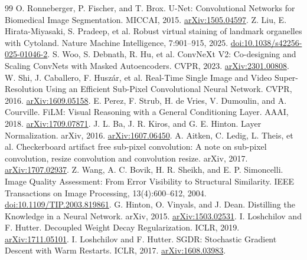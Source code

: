 \documentclass[UTF8,a4paper,zihao=5,fontset=fandol]{ctexart}
\begin{document}
\begin{thebibliography}{99}\small
\setlength{\itemsep}{1pt}
 O. Ronneberger, P. Fischer, and T. Brox. U-Net: Convolutional Networks for Biomedical Image Segmentation. MICCAI, 2015. \href{https://arxiv.org/abs/1505.04597}{arXiv:1505.04597}.
 Z. Liu, E. Hirata-Miyasaki, S. Pradeep, et al. Robust virtual staining of landmark organelles with Cytoland. Nature Machine Intelligence, 7:901--915, 2025. \href{https://doi.org/10.1038/s42256-025-01046-2}{doi:10.1038/s42256-025-01046-2}.
 S. Woo, S. Debnath, R. Hu, et al. ConvNeXt V2: Co-designing and Scaling ConvNets with Masked Autoencoders. CVPR, 2023. \href{https://arxiv.org/abs/2301.00808}{arXiv:2301.00808}.
 W. Shi, J. Caballero, F. Husz\'ar, et al. Real-Time Single Image and Video Super-Resolution Using an Efficient Sub-Pixel Convolutional Neural Network. CVPR, 2016. \href{https://arxiv.org/abs/1609.05158}{arXiv:1609.05158}.
 E. Perez, F. Strub, H. de Vries, V. Dumoulin, and A. Courville. FiLM: Visual Reasoning with a General Conditioning Layer. AAAI, 2018. \href{https://arxiv.org/abs/1709.07871}{arXiv:1709.07871}.
 J. L. Ba, J. R. Kiros, and G. E. Hinton. Layer Normalization. arXiv, 2016. \href{https://arxiv.org/abs/1607.06450}{arXiv:1607.06450}.
 A. Aitken, C. Ledig, L. Theis, et al. Checkerboard artifact free sub-pixel convolution: A note on sub-pixel convolution, resize convolution and convolution resize. arXiv, 2017. \href{https://arxiv.org/abs/1707.02937}{arXiv:1707.02937}.
 Z. Wang, A. C. Bovik, H. R. Sheikh, and E. P. Simoncelli. Image Quality Assessment: From Error Visibility to Structural Similarity. IEEE Transactions on Image Processing, 13(4):600--612, 2004. \href{https://doi.org/10.1109/TIP.2003.819861}{doi:10.1109/TIP.2003.819861}.
 G. Hinton, O. Vinyals, and J. Dean. Distilling the Knowledge in a Neural Network. arXiv, 2015. \href{https://arxiv.org/abs/1503.02531}{arXiv:1503.02531}.
 I. Loshchilov and F. Hutter. Decoupled Weight Decay Regularization. ICLR, 2019. \href{https://arxiv.org/abs/1711.05101}{arXiv:1711.05101}.
 I. Loshchilov and F. Hutter. SGDR: Stochastic Gradient Descent with Warm Restarts. ICLR, 2017. \href{https://arxiv.org/abs/1608.03983}{arXiv:1608.03983}.
\end{thebibliography}
\end{document}
